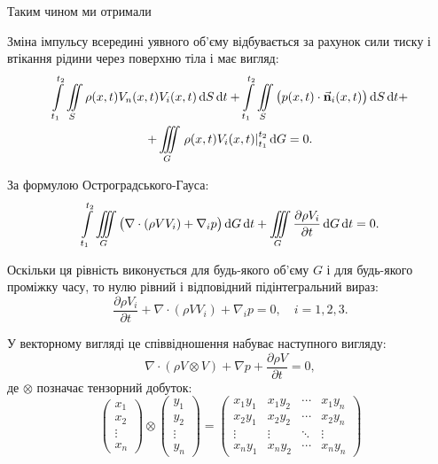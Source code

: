 Таким чином ми отримали
\begin{law*}
	\label{law:impulse-conservation}
	Зміна імпульсу всередині уявного об'єму відбувається за рахунок сили тиску і втікання рідини через поверхню тіла і має вигляд:
	\begin{multline}
	\displaystyle\int\limits_{t_1}^{t_2} \displaystyle\iint\limits_S \rho(x, t) V_n(x, t) V_i(x, t) \mathop{}\!\mathrm{d} S \mathop{}\!\mathrm{d} t+\displaystyle\int\limits_{t_1}^{t_2} \displaystyle\iint\limits_S \big( p(x, t) \cdot \vec{\textbf{n}}_i(x, t) \big) \mathop{}\!\mathrm{d} S \mathop{}\!\mathrm{d} t +\\
	+	 \displaystyle\iiint\limits_G \left. \rho(x, t) V_i(x, t) \right|_{t_1}^{t_2} \mathop{}\!\mathrm{d} G = 0.
	\end{multline}
\end{law*}

За формулою Остроградського-Гауса:
\begin{equation}
	\displaystyle\int\limits_{t_1}^{t_2} \displaystyle\iiint\limits_G \big( \nabla \cdot (\rho V V_i) + \nabla_i p \big) \mathop{}\!\mathrm{d} G \mathop{}\!\mathrm{d} t + \displaystyle\iiint\limits_G \frac{\partial \rho V_i}{\partial t}\mathop{}\!\mathrm{d} G \mathop{}\!\mathrm{d} t = 0.
\end{equation}

Оскільки ця рівність виконується для будь-якого об'єму $G$ і для будь-якого проміжку часу, то нулю рівний і відповідний підінтегральний вираз:
\begin{equation}
\frac{\partial \rho V_i}{\partial t} +	\nabla \cdot (\rho V V_i) + \nabla_i p = 0, \quad i = 1, 2, 3.
\end{equation}

У векторному вигляді це співвідношення набуває наступного вигляду:
\begin{equation}
	\nabla \cdot (\rho V \otimes V) + \nabla p + \frac{\partial \rho V}{\partial t} = 0,
\end{equation}
де $\otimes$ позначає тензорний добуток:
\begin{equation}
	\begin{pmatrix}
		x_1 \\
		x_2 \\
		\vdots \\
		x_n
	\end{pmatrix} 
	\otimes
	\begin{pmatrix}
		y_1 \\
		y_2 \\
		\vdots \\
		y_n
	\end{pmatrix} 
	=
	\begin{pmatrix}
		x_1 y_1 & x_1 y_2 & \cdots & x_1 y_n \\
		x_2 y_1 & x_2 y_2 & \cdots & x_2 y_n \\
		\vdots & \vdots & \ddots & \vdots \\
		x_n y_1 & x_n y_2 & \cdots & x_n y_n
	\end{pmatrix}
\end{equation}

